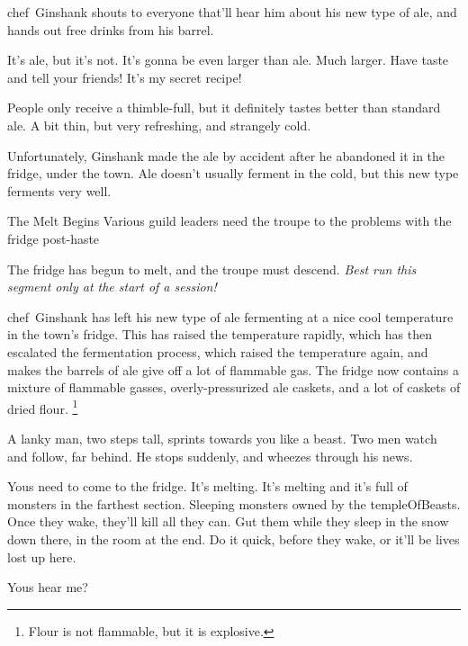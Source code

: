 \Gls{chef}~Ginshank shouts to everyone that'll hear him about his new type of ale, and hands out free drinks from his barrel.

\begin{speechtext}
  It's ale, but it's not.
  It's gonna be even larger than ale.
  Much larger.
  Have taste and tell your friends!
  It's my secret recipe!
\end{speechtext}

People only receive a thimble-full, but it definitely tastes better than standard ale.
A bit thin, but very refreshing, and strangely cold.


Unfortunately, Ginshank made the ale by accident after he abandoned it in the fridge, under the town.
Ale doesn't usually ferment in the cold, but this new type ferments very well.

{The Melt Begins}%
{Various guild leaders need the troupe to the problems with the fridge post-haste}%

The fridge has begun to melt, and the troupe must descend.
\emph{Best run this \gls{segment} only at the start of a session!}

\Gls{chef}~Ginshank has left his new type of ale fermenting at a nice cool temperature in the town's fridge.
This has raised the temperature rapidly, which has then escalated the fermentation process, which raised the temperature again, and makes the barrels of ale give off a lot of flammable gas.
The fridge now contains a mixture of flammable gasses, overly-pressurized ale caskets, and a lot of caskets of dried flour.%
\footnote{Flour is not flammable, but it is explosive.}

\begin{boxtext}
  A lanky man, two \glspl{step} tall, sprints towards you like a beast.
  Two men watch and follow, far behind.
  He stops suddenly, and wheezes through his news.

  \begin{speechtext}
    Yous need to come to the fridge.
    It's melting.
    It's melting and it's full of \glspl{monster} in the farthest section.
    Sleeping \glspl{monster} owned by the \gls{templeOfBeasts}.
    Once they wake, they'll kill all they can.
    Gut them while they sleep in the snow down there, in the room at the end.
    Do it quick, before they wake, or it'll be lives lost up here.

    Yous hear me?
  \end{speechtext}
\end{boxtext}

